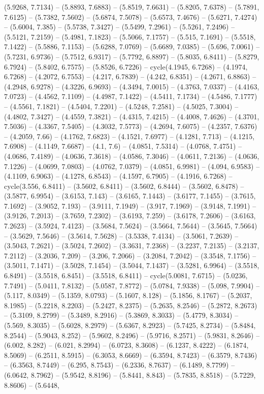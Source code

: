 (5.9268, 7.7134) -- (5.8893, 7.6883) -- (5.8519, 7.6631) -- (5.8205, 7.6378) -- (5.7891, 7.6125) -- (5.7382, 7.5602) -- (5.6874, 7.5078) -- (5.6573, 7.4676) -- (5.6271, 7.4274) -- (5.6004, 7.385) -- (5.5738, 7.3427) -- (5.5499, 7.2961) -- (5.5261, 7.2496) -- (5.5121, 7.2159) -- (5.4981, 7.1823) -- (5.5066, 7.1757) -- (5.515, 7.1691) -- (5.5518, 7.1422) -- (5.5886, 7.1153) -- (5.6288, 7.0769) -- (5.6689, 7.0385) -- (5.696, 7.0061) -- (5.7231, 6.9736) -- (5.7512, 6.9317) -- (5.7792, 6.8897) -- (5.8035, 6.8411) -- (5.8279, 6.7924) -- (5.8402, 6.7575) -- (5.8526, 6.7226) -- cycle(4.1945, 6.7268) -- (4.1974, 6.7268) -- (4.2072, 6.7553) -- (4.217, 6.7839) -- (4.242, 6.8351) -- (4.2671, 6.8863) -- (4.2948, 6.9278) -- (4.3226, 6.9693) -- (4.3494, 7.0015) -- (4.3763, 7.0337) -- (4.4163, 7.0723) -- (4.4562, 7.1109) -- (4.4987, 7.1422) -- (4.5411, 7.1734) -- (4.5486, 7.1777) -- (4.5561, 7.1821) -- (4.5404, 7.2201) -- (4.5248, 7.2581) -- (4.5025, 7.3004) -- (4.4802, 7.3427) -- (4.4559, 7.3821) -- (4.4315, 7.4215) -- (4.4008, 7.4626) -- (4.3701, 7.5036) -- (4.3367, 7.5405) -- (4.3032, 7.5773) -- (4.2694, 7.6075) -- (4.2357, 7.6376) -- (4.2059, 7.66) -- (4.1762, 7.6823) -- (4.1521, 7.6977) -- (4.1281, 7.713) -- (4.1215, 7.6908) -- (4.1149, 7.6687) -- (4.1, 7.6) -- (4.0851, 7.5314) -- (4.0768, 7.4751) -- (4.0686, 7.4189) -- (4.0636, 7.3618) -- (4.0586, 7.3046) -- (4.0611, 7.2136) -- (4.0636, 7.1226) -- (4.0699, 7.0803) -- (4.0762, 7.0379) -- (4.0851, 6.9981) -- (4.094, 6.9583) -- (4.1109, 6.9063) -- (4.1278, 6.8543) -- (4.1597, 6.7905) -- (4.1916, 6.7268) -- cycle(3.556, 6.8411) -- (3.5602, 6.8411) -- (3.5602, 6.8444) -- (3.5602, 6.8478) -- (3.5877, 6.9954) -- (3.6153, 7.143) -- (3.6165, 7.1443) -- (3.6177, 7.1455) -- (3.7615, 7.1692) -- (3.9052, 7.193) -- (3.9111, 7.1949) -- (3.917, 7.1969) -- (3.9148, 7.1991) -- (3.9126, 7.2013) -- (3.7659, 7.2302) -- (3.6193, 7.259) -- (3.6178, 7.2606) -- (3.6163, 7.2623) -- (3.5924, 7.4123) -- (3.5684, 7.5624) -- (3.5664, 7.5644) -- (3.5645, 7.5664) -- (3.5629, 7.5646) -- (3.5614, 7.5628) -- (3.5338, 7.4134) -- (3.5061, 7.2639) -- (3.5043, 7.2621) -- (3.5024, 7.2602) -- (3.3631, 7.2368) -- (3.2237, 7.2135) -- (3.2137, 7.2112) -- (3.2036, 7.209) -- (3.206, 7.2066) -- (3.2084, 7.2042) -- (3.3548, 7.1756) -- (3.5011, 7.1471) -- (3.5028, 7.1454) -- (3.5044, 7.1437) -- (3.5281, 6.9964) -- (3.5518, 6.8491) -- (3.5518, 6.8451) -- (3.5518, 6.8411) -- cycle(5.0081, 7.6715) -- (5.0236, 7.7491) -- (5.0411, 7.8132) -- (5.0587, 7.8772) -- (5.0784, 7.9338) -- (5.098, 7.9904) -- (5.117, 8.0349) -- (5.1359, 8.0793) -- (5.1607, 8.128) -- (5.1856, 8.1767) -- (5.2037, 8.1985) -- (5.2218, 8.2203) -- (5.2427, 8.2375) -- (5.2635, 8.2546) -- (5.2872, 8.2673) -- (5.3109, 8.2799) -- (5.3489, 8.2916) -- (5.3869, 8.3033) -- (5.4779, 8.3034) -- (5.569, 8.3035) -- (5.6028, 8.2979) -- (5.6367, 8.2923) -- (5.7425, 8.2734) -- (5.8484, 8.2544) -- (5.9043, 8.252) -- (5.9602, 8.2496) -- (5.9716, 8.2571) -- (5.9831, 8.2646) -- (6.002, 8.282) -- (6.021, 8.2994) -- (6.0723, 8.3608) -- (6.1237, 8.4222) -- (6.1874, 8.5069) -- (6.2511, 8.5915) -- (6.3053, 8.6669) -- (6.3594, 8.7423) -- (6.3579, 8.7436) -- (6.3563, 8.7449) -- (6.295, 8.7543) -- (6.2336, 8.7637) -- (6.1489, 8.7799) -- (6.0642, 8.7962) -- (5.9542, 8.8196) -- (5.8441, 8.843) -- (5.7835, 8.8518) -- (5.7229, 8.8606) -- (5.6448, 